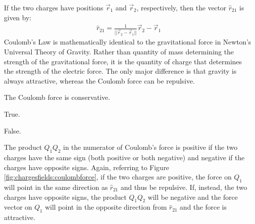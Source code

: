 If the two charges have positions $\vec r_1$ and $\vec r_2$, respectively, then the vector $\hat r_{21}$ is given by:
\begin{align*}
\hat r_{21} = \frac{1}{||\vec r_2 - \vec r_1||}\vec r_2 - \vec r_1
\end{align*}
Coulomb's Law is mathematically identical to the gravitational force in Newton's Universal Theory of Gravity. Rather than quantity of mass determining the strength of the gravitational force, it is the quantity of charge that determines the strength of the electric force. The only major difference is that gravity is always attractive, whereas the Coulomb force can be repulsive.
\begin{checkpoint}\label{cp:chargesfields:conservative}
\begin{MCquestion}{The Coulomb force is conservative.}
\item True. \correct
\item False.
\end{MCquestion}
\end{checkpoint}
The product $Q_1Q_2$ in the numerator of Coulomb's force is positive if the two charges have the same sign (both positive or both negative) and negative if the charges have opposite signs. Again, referring to Figure \ref{fig:chargesfields:coulombforce}, if the two charges are positive, the force on $Q_1$ will point in the same direction as $\hat r_{21}$ and thus be repulsive. If, instead, the two charges have opposite signs, the product $Q_1Q_2$ will be negative and the force vector on $Q_1$ will point in the opposite direction from $\hat r_{21}$ and the force is attractive. 

